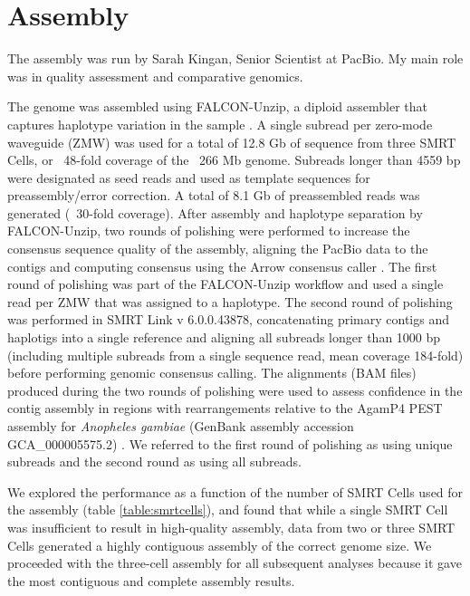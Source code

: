 \section{Assembly}

The assembly was run by Sarah Kingan, Senior Scientist at PacBio. My main role was in quality assessment and comparative genomics. \\

\par{
The genome was assembled using FALCON-Unzip, a diploid assembler that captures haplotype variation in the sample \cite{falcon}. A single subread per zero-mode waveguide (ZMW) was used for a total of 12.8 Gb of sequence from three SMRT Cells, or ~48-fold coverage of the ~266 Mb genome. Subreads longer than 4559 bp were designated as seed reads and used as template sequences for preassembly/error correction. A total of 8.1 Gb of preassembled reads was generated (~30-fold coverage). After assembly and haplotype separation by FALCON-Unzip, two rounds of polishing were performed to increase the consensus sequence quality of the assembly, aligning the PacBio data to the contigs and computing consensus using the Arrow consensus caller \cite{arrow}. The first round of polishing was part of the FALCON-Unzip workflow and used a single read per ZMW that was assigned to a haplotype. The second round of polishing was performed in SMRT Link v 6.0.0.43878, concatenating primary contigs and haplotigs into a single reference and aligning all subreads longer than 1000 bp (including multiple subreads from a single sequence read, mean coverage 184-fold) before performing genomic consensus calling. The alignments (BAM files) produced during the two rounds of polishing were used to assess confidence in the contig assembly in regions with rearrangements relative to the AgamP4 PEST assembly for \textit{Anopheles gambiae} (GenBank assembly accession GCA\_000005575.2) \cite{PEST}\cite{PEST2}. We referred to the first round of polishing as using unique subreads and the second round as using all subreads.
} \\

\par{
We explored the performance as a function of the number of SMRT Cells used for the assembly (table \ref{table:smrtcells}), and found that while a single SMRT Cell was insufficient to result in high-quality assembly, data from two or three SMRT Cells generated a highly contiguous assembly of the correct genome size. We proceeded with the three-cell assembly for all subsequent analyses because it gave the most contiguous and complete assembly results.
}

